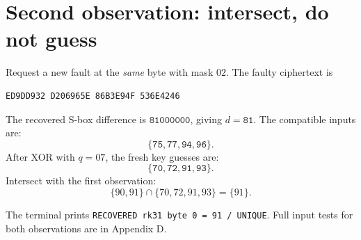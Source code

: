 \documentclass[11pt,a4paper]{report}
\newcommand{\hx}[1]{\texttt{#1}}
\begin{document}
\section{Second observation: intersect, do not guess}
Request a new fault at the \emph{same} byte with mask \(02\). The faulty ciphertext is
\begin{Verbatim}[numbers=none]
ED9DD932 D206965E 86B3E94F 536E4246
\end{Verbatim}
The recovered S-box difference is \(\hx{81000000}\), giving \(d=\hx{81}\). The compatible inputs are:
\[\{\hx{75},\hx{77},\hx{94},\hx{96}\}.\]
After XOR with \(q=07\), the fresh key guesses are:
\[\{\hx{70},\hx{72},\hx{91},\hx{93}\}.\]
Intersect with the first observation:
\[\boxed{\{90,91\}\cap\{70,72,91,93\}=\{91\}}.\]
\begin{center}
\end{center}
The terminal prints \texttt{RECOVERED rk31 byte 0 = 91 / UNIQUE}. Full input tests for both observations are in Appendix D.
\end{document}
